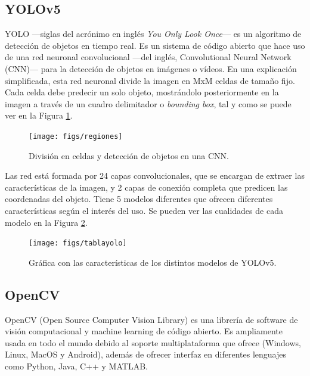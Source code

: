 \subsection{YOLOv5}
\label{sec:yolo}
YOLO ---siglas del acrónimo en inglés \textit{You Only Look Once}--- es un algoritmo de detección de objetos en tiempo real. Es un sistema de código abierto que hace uso de una red neuronal convolucional ---del inglés, Convolutional Neural Network (CNN)--- para la detección de objetos en imágenes o vídeos. En una explicación simplificada, esta red neuronal divide la imagen en MxM celdas de tamaño fijo. Cada celda debe predecir un solo objeto, mostrándolo posteriormente en la imagen a través de un cuadro delimitador o \textit{bounding box}, tal y como se puede ver en la Figura \ref{fig:regiones}.\\
\begin{figure} [h!]
  \begin{center}
    \texttt{[image: figs/regiones]}
  \end{center}
  \caption{División en celdas y detección de objetos en una CNN.}
  \label{fig:regiones}
\end{figure}
Las red está formada por 24 capas convolucionales, que se encargan de extraer las características de la imagen, y 2 capas de conexión completa que predicen las coordenadas del objeto. Tiene 5 modelos diferentes que ofrecen diferentes características según el interés del uso. Se pueden ver las cualidades de cada modelo en la Figura \ref{fig:tablayolo}. \\
\begin{figure} [h!]
  \begin{center}
    \texttt{[image: figs/tablayolo]}
  \end{center}
  \caption[]{Gráfica con las características de los distintos modelos de YOLOv5\footnotemark.} \label{fig:tablayolo}
\end{figure}

\subsection{OpenCV}
\label{sec:opencv}
OpenCV (Open Source Computer Vision Library) es una librería de software de visión computacional y machine learning de código abierto. Es ampliamente usada en todo el mundo debido al soporte multiplataforma que ofrece (Windows, Linux, MacOS y Android), además de ofrecer interfaz en diferentes lenguajes como Python, Java, C++ y MATLAB.\\

